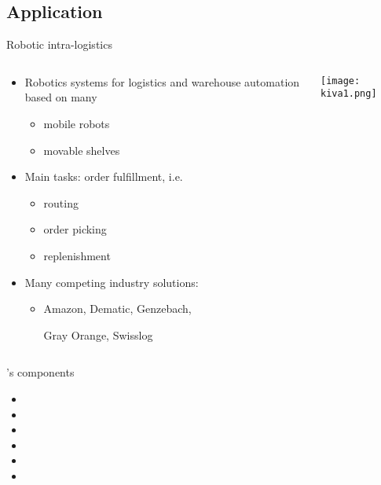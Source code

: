 \subsection{Application}
\begin{frame}[label=asprilo]{Robotic intra-logistics}
  \begin{columns}
    \begin{column}{0.69\textwidth}
      \begin{itemize}
      \item \alert{Robotics systems} for \alert{logistics} and \alert{warehouse automation}
        based on many
        \begin{itemize}
        \item mobile robots
        \item movable shelves
        \end{itemize}
        \smallskip
      \item Main tasks: \alert{order fulfillment}, i.e.
        \begin{itemize}
        \item routing
        \item order picking
        \item replenishment
        \end{itemize} %
        \smallskip
      \item Many competing \alert{industry solutions}:
        \begin{itemize}
        \item
          Amazon,
          Dematic,
          Genzebach,\par
          Gray Orange,
          Swisslog
        \end{itemize}
      \end{itemize}
    \end{column}
    \begin{column}{0.35\textwidth}  %
      \begin{center}
        \texttt{[image: kiva1.png]}
      \end{center}
    \end{column}
  \end{columns}
\end{frame}
\begin{frame}{\asprilo's components}
  \bigskip
  \begin{itemize}
  \item<1-> 
  \item<1-> 
  \item<1-> 
  \item<1-> 
  \item<1-> 
    \bigskip
  \item<1->
  \end{itemize}
\end{frame}
